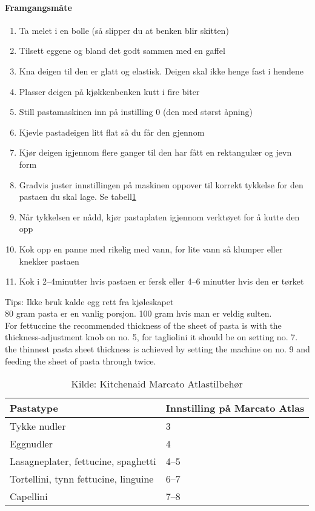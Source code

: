 \documentclass[12pt,a4paper]{book}
\begin{document}
\paragraph{Framgangsmåte}
\begin{enumerate}[noitemsep]
	\item Ta melet i en bolle (så slipper du at benken blir skitten)
	\item Tilsett eggene og bland det godt sammen med en gaffel
	\item Kna deigen til den er glatt og elastisk. Deigen skal ikke henge fast i hendene
	\item Plasser deigen på kjøkkenbenken kutt i fire biter
	\item Still pastamaskinen inn på instilling 0 (den med størst åpning)
	\item Kjevle pastadeigen litt flat så du får den gjennom
	\item Kjør deigen igjennom flere ganger til den har fått en rektangulær og jevn form
	\item Gradvis juster innstillingen på maskinen oppover til korrekt tykkelse for den pastaen du skal lage. Se tabell\ref{pastatyper}
	\item Når tykkelsen er nådd, kjør pastaplaten igjennom verktøyet for å kutte den opp
	\item Kok opp en panne med rikelig med vann, for lite vann så klumper eller knekker pastaen
	\item Kok i 2--4minutter hvis pastaen er fersk eller 4--6 minutter hvis den er tørket
\end{enumerate}

Tips: Ikke bruk kalde egg rett fra kjøleskapet\\ 
			80 gram pasta er en vanlig porsjon. 100 gram hvis man er veldig sulten.\\

For fettuccine the recommended thickness of the sheet of pasta is with the  thickness-adjustment knob on no. 5, for tagliolini it should
be on setting no. 7.
the thinnest pasta sheet thickness is achieved by setting the machine
on no. 9 and feeding the sheet of pasta through twice.\\


\begin{table}[]
\centering
\begin{tabular}{ll}
\hline
Pastatype                            & Innstilling på Marcato Atlas \\ \hline
Tykke nudler                         & 3                            \\
Eggnudler                            & 4                            \\
Lasagneplater, fettucine, spaghetti  & 4--5                         \\
Tortellini, tynn fettucine, linguine & 6--7                         \\
Capellini                            & 7--8                         \\ \hline
\end{tabular}
\caption{Kilde: Kitchenaid Marcato Atlastilbehør}
\label{pastatyper}
\end{table}
\end{document}
